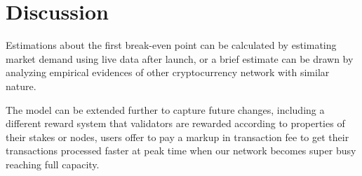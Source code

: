 \documentclass{article}
\begin{document}
\section{Discussion}
Estimations about the first break-even point can be calculated by estimating market demand using live data after launch, or a brief estimate can be drawn by analyzing empirical evidences of other cryptocurrency network with similar nature. \par

The model can be extended further to capture future changes, including a different reward system that validators are rewarded according to properties of their stakes or nodes, users offer to pay a markup in transaction fee to get their transactions processed faster at peak time when our network becomes super busy reaching full capacity. 
\end{document}
